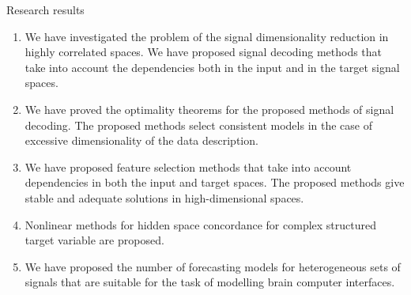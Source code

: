 \documentclass[10pt]{beamer}
\begin{document}
\begin{frame}{Research results}
\begin{enumerate}
	\item We have investigated the problem of the signal dimensionality reduction in highly correlated spaces.
	We have proposed signal decoding methods that take into account the dependencies both in the input and in the target signal spaces.
	\vfill
	\item We have proved the optimality theorems for the proposed methods of signal decoding. The proposed methods select consistent models in the case of excessive dimensionality of the data description.
	\vfill
	\item We have proposed feature selection methods that take into account dependencies in both the input and target spaces. The proposed methods give stable and adequate solutions in high-dimensional spaces.
	\vfill
	\item Nonlinear methods for hidden space concordance for complex structured target variable are proposed.
	\vfill
	\item We have proposed the number of forecasting models for heterogeneous sets of signals that are suitable for the task of modelling brain computer interfaces.
\end{enumerate}
\end{frame}
\end{document}
